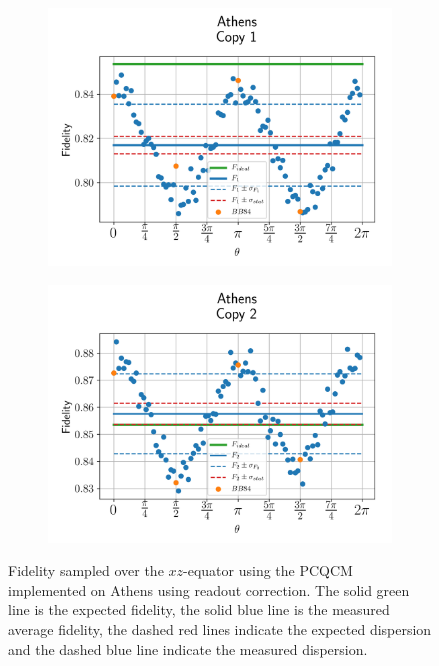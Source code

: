   \begin{figure}[H]
    \centering
    \begin{subfigure}{.5\textwidth}
      \centering
      \includegraphics[width=\textwidth]{Figures/PhaseCovariant/IBM/OnlyEquator/results_athens_copy1.png}
      \label{fig:pc_uncorrected_athens_equator_1}
    \end{subfigure}%
    \begin{subfigure}{.5\textwidth}
      \centering
      \includegraphics[width=\textwidth]{Figures/PhaseCovariant/IBM/OnlyEquator/results_athens_copy2.png}
      \label{fig:pc_uncorrected_athens_equator_2}
    \end{subfigure}
    \vspace{-0.5cm}
    \caption{Fidelity sampled over the $xz$-equator using the PCQCM implemented on Athens using readout correction. The solid green line is the expected fidelity, the solid blue line is the measured average fidelity, the dashed red lines indicate the expected dispersion and the dashed blue line indicate the measured dispersion.}
    \label{fig:pc_uncorrected_athens_equator}
  \end{figure}
  
